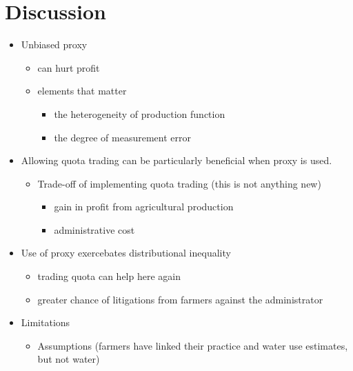 \documentclass[
  letterpaper,
  DIV=11,
  numbers=noendperiod]{scrartcl}
\providecommand{\tightlist}{%
  \setlength{\itemsep}{0pt}\setlength{\parskip}{0pt}}\usepackage{longtable,booktabs,array}
\begin{document}
\section{Discussion}\label{discussion}

\begin{itemize}
\tightlist
\item
  Unbiased proxy

  \begin{itemize}
  \tightlist
  \item
    can hurt profit\\
  \item
    elements that matter

    \begin{itemize}
    \tightlist
    \item
      the heterogeneity of production function
    \item
      the degree of measurement error
    \end{itemize}
  \end{itemize}
\item
  Allowing quota trading can be particularly beneficial when proxy is
  used.

  \begin{itemize}
  \tightlist
  \item
    Trade-off of implementing quota trading (this is not anything new)

    \begin{itemize}
    \tightlist
    \item
      gain in profit from agricultural production
    \item
      administrative cost
    \end{itemize}
  \end{itemize}
\item
  Use of proxy exercebates distributional inequality

  \begin{itemize}
  \tightlist
  \item
    trading quota can help here again
  \item
    greater chance of litigations from farmers against the administrator
  \end{itemize}
\item
  Limitations

  \begin{itemize}
  \tightlist
  \item
    Assumptions (farmers have linked their practice and water use
    estimates, but not water)


\end{itemize}
\end{itemize}
\end{document}
